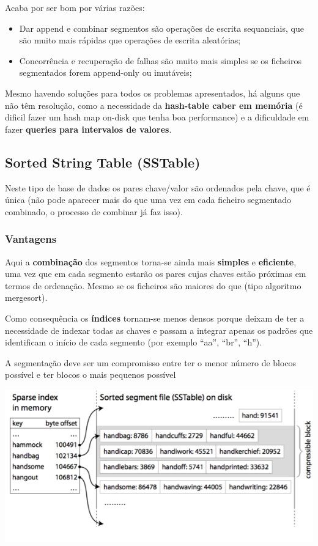 \documentclass{article}
\begin{document}
Acaba por ser bom por várias razões:
\begin{itemize}
  \item Dar append e combinar segmentos são operações de escrita sequanciais,
  que são muito mais rápidas que operações de escrita aleatórias;
  \item Concorrência e recuperação de falhas são muito mais simples se os ficheiros
  segmentados forem append-only ou imutáveis;
\end{itemize}

Mesmo havendo soluções para todos os problemas apresentados, há alguns que não têm
resolução, como a necessidade da
\textbf{hash-table caber em memória} (é dificil fazer um hash map on-disk que tenha
boa performance) e a dificuldade em fazer
\textbf{queries para intervalos de valores}.

\subsection{Sorted String Table (SSTable)}

Neste tipo de base de dados os pares chave/valor são ordenados pela chave, que é única (não
pode aparecer mais do que uma vez em cada ficheiro segmentado combinado, o processo
de combinar já faz isso).

\pagebreak

\subsubsection{Vantagens}

Aqui a \textbf{combinação} dos segmentos torna-se ainda mais \textbf{simples} e \textbf{eficiente}, uma vez que em cada segmento estarão os
pares cujas chaves estão próximas em termos de ordenação. Mesmo se os ficheiros
são maiores do que (tipo algoritmo mergesort).

Como consequência os \textbf{índices} tornam-se menos densos porque deixam de ter a necessidade
de indexar todas as chaves e passam a integrar apenas os padrões que identificam o início de
cada segmento (por exemplo “aa”, “br”, “h”).

A segmentação deve ser um compromisso entre ter o menor número de blocos possível e ter blocos o
mais pequenos possível

\begin{center}
  \includegraphics[scale=0.3]{44}
\end{center}
\end{document}
